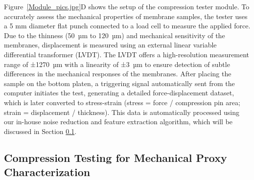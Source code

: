 \documentclass[preprint,12pt,times]{elsarticle}
\begin{document}
Figure~\ref{Module_pics.jpg}D shows the setup of the compression tester module. To accurately assess the mechanical properties of membrane samples, the tester uses a 5 mm diameter flat punch connected to a load cell to measure the applied force. Due to the thinness (50~µm to 120~µm) and mechanical sensitivity of the membranes, displacement is measured using an external linear variable differential transformer (LVDT). The LVDT offers a high-resolution measurement range of ±1270~µm with a linearity of ±3~µm to ensure detection of subtle differences in the mechanical responses of the membranes. After placing the sample on the bottom platen, a triggering signal automatically sent from the computer initiates the test, generating a detailed force-displacement dataset, which is later converted to stress-strain (stress = force / compression pin area; strain = displacement / thickness). This data is automatically processed using our in-house noise reduction and feature extraction algorithm, which will be discussed in Section \ref{Compression Testing for Mechanical Proxy Characterization}.



\subsection{Compression Testing for Mechanical Proxy Characterization}
\label{Compression Testing for Mechanical Proxy Characterization}
\end{document}
